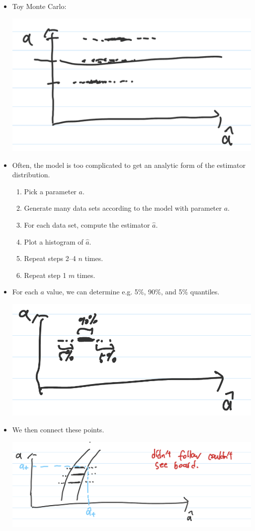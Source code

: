 \begin{itemize}
    \item Toy Monte Carlo:

          \includegraphics[width=0.6\linewidth]{Images/lec11-toy-monte-carlo.png}

    \item Often, the model is too complicated to get an analytic form of the estimator distribution.
          \begin{enumerate}
              \item Pick a parameter $a$.
              \item Generate many data sets according to the model with parameter $a$.
              \item For each data set, compute the estimator $\hat{a}$.
              \item Plot a histogram of $\hat{a}$.
              \item Repeat steps 2–4 $n$ times.
              \item Repeat step 1 $m$ times.
          \end{enumerate}
    \item For each $a$ value, we can determine e.g. 5\%, 90\%, and 5\% quantiles.

          \includegraphics[width=0.6\linewidth]{Images/lec11-mc-intervals.png}

    \item We then connect these points.

          \includegraphics[width=0.6\linewidth]{Images/lec11-fit-connect.png}


\end{itemize}
